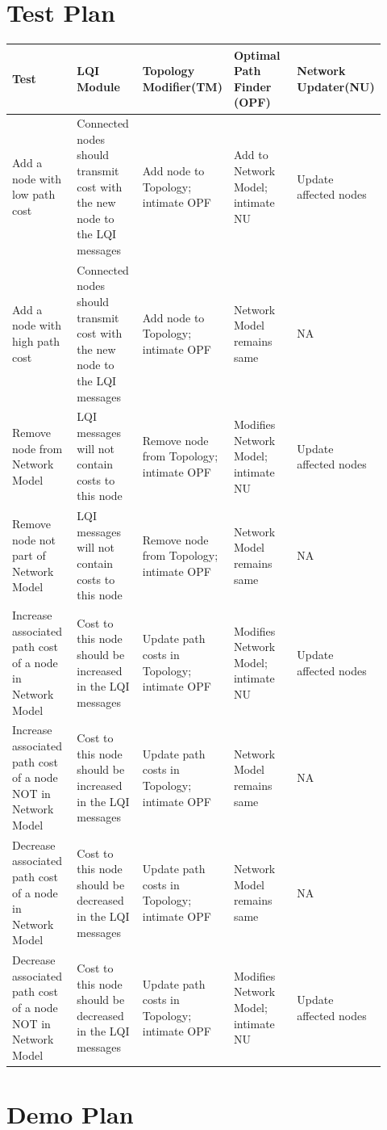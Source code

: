 \documentclass{article}
\begin{document}
\section{Test Plan}
\begin{tabular}{  | p{0.185\linewidth} | p{0.185\linewidth} | p{0.185\linewidth} | p{0.185\linewidth} | p{0.185\linewidth} |}
\hline
\textbf{Test}	&	\textbf{LQI Module}	&	\textbf{Topology Modifier(TM)}	&	\textbf{Optimal Path Finder (OPF)}	&
\textbf{Network Updater(NU)}\\ 
\hline \hline
Add a node with low path cost	&	Connected nodes should transmit cost with the new node to the LQI messages	&	Add node to Topology; intimate OPF	&	Add to Network Model; intimate NU	&	Update affected nodes\\ 
\hline
Add a node with high path cost	&	Connected nodes should transmit cost with the new node to the LQI messages	&	Add node to Topology; intimate OPF	&	Network Model remains same	&	NA\\ 
\hline
Remove node from Network Model	&	LQI messages will not contain costs to this node	&	Remove node from Topology; intimate OPF	&	Modifies Network Model; intimate NU	&	Update affected nodes\\ 
\hline
Remove node not part of Network Model	&	LQI messages will not contain costs to this node	&	Remove node from Topology; intimate OPF	&	Network Model remains same	&	NA\\ 
\hline
Increase associated path cost of a node in Network Model	&	Cost to this node should be increased in the LQI messages	&	Update path costs in Topology; intimate OPF	&	Modifies Network Model; intimate NU	&	Update affected nodes\\ 
\hline
Increase associated path cost of a node NOT in Network Model	&	Cost to this node should be increased in the LQI messages	&	Update path costs in Topology; intimate OPF	&	Network Model remains same	&	NA\\ 
\hline
Decrease associated path cost of a node in Network Model	&	Cost to this node should be decreased in the LQI messages	&	Update path costs in Topology; intimate OPF	&	Network Model remains same	&	NA\\ 
\hline
Decrease associated path cost of a node NOT in Network Model	&	Cost to this node should be decreased in the LQI messages	&	Update path costs in Topology; intimate OPF	&	Modifies Network Model; intimate NU	&	Update affected nodes \\
\hline
\end{tabular}
\section{Demo Plan}
\end{document}
